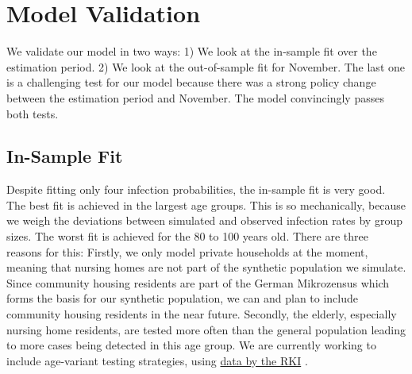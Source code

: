 \section{Model Validation}
\label{sec:model_validation}

We validate our model in two ways: 1) We look at the in-sample fit over the estimation
period. 2) We look at the out-of-sample fit for November. The last one is a challenging
test for our model because there was a strong policy change between the estimation
period and November. The model convincingly passes both tests.


\subsection{In-Sample Fit}
\label{sub:in_sample_fit}

Despite fitting only four infection probabilities, the in-sample fit is very good.
The best fit is achieved in the largest age groups.
This is so mechanically, because we weigh the
deviations between simulated and observed infection rates by group sizes. The worst fit
is achieved for the 80 to 100 years old.
There are three reasons for this: Firstly, we only model private households at
the moment, meaning that nursing homes are not part of the synthetic population we
simulate. Since community housing residents are part of the German Mikrozensus
\citep{FDSAeDBUDL2018} which forms the basis for our synthetic population, we can and
plan to include community housing residents in the near future.
Secondly, the elderly, especially nursing home residents, are tested more often than
the general population leading to more cases being detected in this age group.
We are currently working to include age-variant testing strategies,
using \href{https://ars.rki.de/Content/COVID19/Main.aspx}{data by the RKI}
\citep{Seifried2020}.

